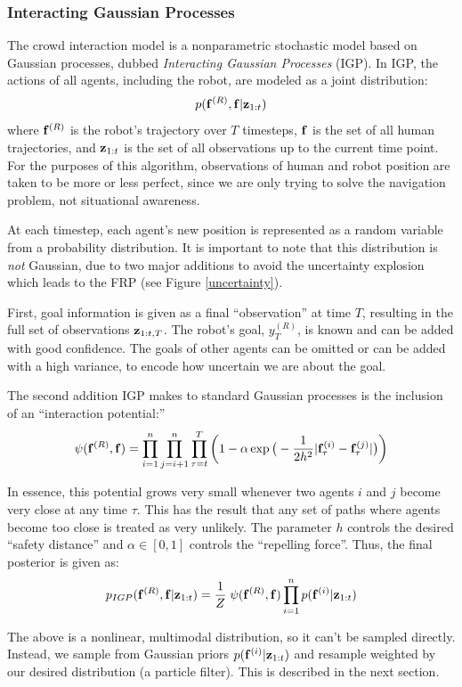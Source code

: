 \documentclass[a4paper,11pt,headings=small]{article}
\begin{document}
\subsubsection*{Interacting Gaussian Processes}
\quad The crowd interaction model is a nonparametric stochastic model based on Gaussian processes, dubbed \emph{Interacting Gaussian Processes} (IGP). In IGP, the actions of all agents, including the robot, are modeled as a joint distribution:
$$p(\mathbf{f}^{(R)},\mathbf{f}|\mathbf{z}_{1:t})$$
where $\mathbf{f}^{(R)}$ is the robot's trajectory over $T$ timesteps, $\mathbf{f}$ is the set of all human trajectories, and $\mathbf{z}_{1:t}$ is the set of all observations up to the current time point. For the purposes of this algorithm, observations of human and robot position are taken to be more or less perfect, since we are only trying to solve the navigation problem, not situational awareness.

At each timestep, each agent's new position is represented as a random variable from a probability distribution. It is important to note that this distribution is \emph{not} Gaussian, due to two major additions to avoid the uncertainty explosion which leads to the FRP (see Figure \ref{uncertainty}).

First, goal information is given as a final ``observation'' at time $T$, resulting in the full set of observations $\mathbf{z}_{1:t,T}$. The robot's goal, $y_T^{(R)}$, is known and can be added with good confidence. The goals of other agents can be omitted or can be added with a high variance, to encode how uncertain we are about the goal.

The second addition IGP makes to standard Gaussian processes is the inclusion of an ``interaction potential:''
$$ \psi(\mathbf{f}^{(R)},\mathbf{f}) = \prod_{i=1}^n \prod_{j=i+1}^n \prod_{\tau=t}^T \left( 1 - \alpha \exp\big(-\frac{1}{2h^2}|\mathbf{f}^{(i)}_{\tau} - \mathbf{f}^{(j)}_{\tau}|\big) \right)$$

In essence, this potential grows very small whenever two agents $i$ and $j$ become very close at any time $\tau$. This has the result that any set of paths where agents become too close is treated as very unlikely. The parameter $h$ controls the desired ``safety distance'' and $\alpha \in [0, 1]$ controls the ``repelling force''. Thus, the final posterior is given as:
$$ p_{IGP}(\mathbf{f}^{(R)},\mathbf{f} | \mathbf{z}_{1:t}) = \frac{1}{Z} \; \psi(\mathbf{f}^{(R)},\mathbf{f}) \prod_{i=1}^n p(\mathbf{f}^{(i)} | \mathbf{z}_{1:t}) $$


The above is a nonlinear, multimodal distribution, so it can't be sampled directly. Instead, we sample from Gaussian priors $p(\mathbf{f}^{(i)}|\mathbf{z}_{1:t})$ and resample weighted by our desired distribution (a particle filter). This is described in the next section.
\end{document}
